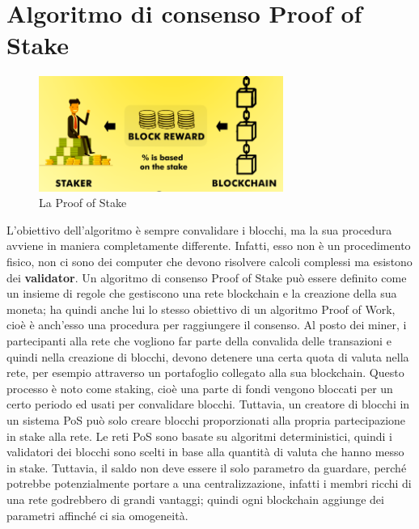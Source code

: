 \documentclass[a4paper,11pt]{report}
\begin{document}
\section{Algoritmo di consenso Proof of Stake}
\begin{figure}[htbp] 
\begin{center}
\includegraphics[width=8cm]{img/pos.png} 
\end{center}
\caption{La Proof of Stake}
\end{figure}
L'obiettivo dell'algoritmo è sempre convalidare i blocchi, ma la sua procedura avviene in maniera completamente differente. Infatti, esso non è un procedimento fisico, non ci sono dei computer che devono risolvere calcoli complessi ma esistono dei \textbf{validator}.
Un algoritmo di consenso Proof of Stake può essere definito come un insieme di regole che gestiscono una rete blockchain e la creazione della sua moneta; ha quindi anche lui lo stesso obiettivo di un algoritmo Proof of Work, cioè è anch'esso una procedura per raggiungere il consenso. 
Al posto dei miner, i partecipanti alla rete che vogliono far parte della convalida delle transazioni e quindi nella creazione di blocchi, devono detenere una certa quota di valuta nella rete, per esempio attraverso un portafoglio collegato alla sua blockchain. Questo processo è noto come staking, cioè una parte di fondi vengono bloccati per un certo periodo ed usati per convalidare blocchi. Tuttavia, un creatore di blocchi in un sistema PoS può solo creare blocchi proporzionati alla propria partecipazione in stake alla rete.
Le reti PoS sono basate su algoritmi deterministici, quindi i validatori dei blocchi sono scelti in base alla quantità di valuta che hanno messo in stake. Tuttavia, il saldo non deve essere il solo parametro da guardare, perché potrebbe potenzialmente portare a una centralizzazione, infatti i membri ricchi di una rete godrebbero di grandi vantaggi; quindi ogni blockchain aggiunge dei parametri affinché ci sia omogeneità.
\end{document}
